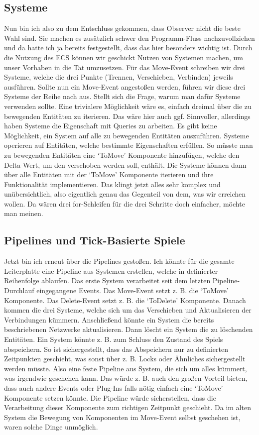 \documentclass{article}
\begin{document}
    \subsection{Systeme}
    Nun bin ich also zu dem Entschluss gekommen, dass Observer nicht die beste Wahl sind.
    Sie machen es zusätzlich schwer den Programm-Fluss
    nachzuvollziehen und da hatte ich ja bereits festgestellt, dass das hier besonders wichtig ist.
    Durch die Nutzung des ECS können wir geschickt Nutzen von Systemen machen, um unser Vorhaben in die Tat umzusetzen.
    Für das Move-Event schreiben wir drei Systeme, welche die drei Punkte (Trennen, Verschieben, Verbinden) jeweils ausführen.
    Sollte nun ein Move-Event angestoßen werden, führen wir diese drei Systeme der Reihe nach aus.
    Stellt sich die Frage, warum man dafür Systeme verwenden sollte.
    Eine trivialere Möglichkeit wäre es, einfach dreimal über die zu bewegenden Entitäten zu iterieren.
    Das wäre hier auch ggf. Sinnvoller, allerdings haben Systeme die Eigenschaft mit Queries zu arbeiten.
    Es gibt keine Möglichkeit, ein System auf alle zu bewegenden Entitäten auszuführen.
    Systeme operieren auf Entitäten, welche bestimmte Eigenschaften erfüllen.
    So müsste man zu bewegenden Entitäten eine `ToMove' Komponente hinzufügen,
    welche den Delta-Wert, um den verschoben werden soll, enthält.
    Die Systeme können dann über alle Entitäten mit der `ToMove' Komponente iterieren und ihre Funktionalität implementieren.
    Das klingt jetzt alles sehr komplex und unübersichtlich, also eigentlich genau das Gegenteil von dem, was wir erreichen wollen.
    Da wären drei for-Schleifen für die drei Schritte doch einfacher, möchte man meinen.

    \subsection{Pipelines und Tick-Basierte Spiele}
    Jetzt bin ich erneut über die Pipelines gestoßen.
    Ich könnte für die gesamte Leiterplatte eine Pipeline aus Systemen erstellen, welche in definierter Reihenfolge ablaufen.
    Das erste System verarbeitet seit dem letzten Pipeline-Durchlauf eingegangene Events.
    Das Move-Event setzt z. B. die `ToMove' Komponente.
    Das Delete-Event setzt z. B. die `ToDelete' Komponente.
    Danach kommen die drei Systeme, welche sich um das Verschieben und Aktualisieren der Verbindungen kümmern.
    Anschließend könnte ein System die bereits beschriebenen Netzwerke aktualisieren.
    Dann löscht ein System die zu löschenden Entitäten.
    Ein System könnte z. B. zum Schluss den Zustand des Spiels abspeichern.
    So ist sichergestellt, dass das Abspeichern nur zu definierten Zeitpunkten geschieht, was sonst über z. B. Locks
    oder Ähnliches sichergestellt werden müsste.
    Also eine feste Pipeline aus System, die sich um alles kümmert, was irgendwie geschehen kann.
    Das würde z. B. auch den großen Vorteil bieten, dass auch andere Events oder Plug-Ins falls nötig einfach eine
    `ToMove' Komponente setzen könnte.
    Die Pipeline würde sicherstellen, dass die Verarbeitung dieser Komponente zum richtigen Zeitpunkt geschieht.
    Da im alten System die Bewegung von Komponenten im Move-Event selbst geschehen ist,  waren solche Dinge unmöglich.
\end{document}
